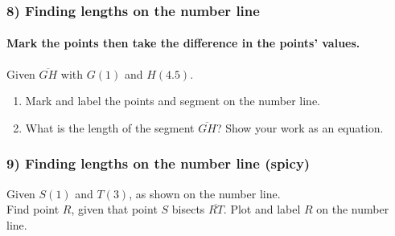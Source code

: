 \documentclass{beamer}
\begin{document}
  \frame
  {
    \frametitle{8) Finding lengths on the number line}
    \framesubtitle{Mark the points then take the difference in the points' values.}
    Given $\overline{GH}$ with $G(1)$ and $H(4.5)$. \\[1.5cm]
      \begin{enumerate}
        \item Mark and label the points and segment on the number line.
        \item What is the length of the segment $\overline{GH}$? Show your work as an equation.
      \end{enumerate} \vspace{2cm}  
  }

  \frame
  {
    \frametitle{9) Finding lengths on the number line (spicy)}
    Given $S(1)$ and $T(3)$, as shown on the number line. \\[0.25cm]
    Find point $R$, given that point $S$ bisects $\overline{RT}$. Plot and label $R$ on the number line.\\[0.5cm]
       \vspace{4cm}  
  }
\end{document}
